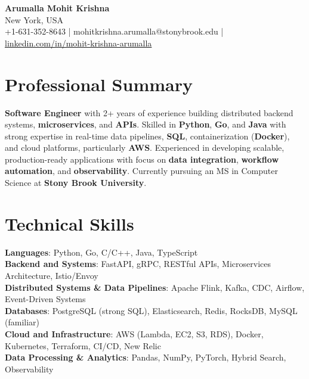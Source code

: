 \documentclass[letterpaper,11pt]{article}
\begin{document}
\begin{center}
  {\Large \textbf{Arumalla Mohit Krishna}} \\
  New York, USA \\
  +1-631-352-8643 \enspace | \enspace mohitkrishna.arumalla@stonybrook.edu \enspace | \enspace \href{https://www.linkedin.com/in/mohit-krishna-arumalla}{linkedin.com/in/mohit-krishna-arumalla}
\end{center}

\section{Professional Summary}
  \begin{itemize}[leftmargin=0.15in, label={}]
    \small{\item{
     \textbf{Software Engineer} with 2+ years of experience building distributed backend systems, \textbf{microservices}, and \textbf{APIs}. Skilled in \textbf{Python}, \textbf{Go}, and \textbf{Java} with strong expertise in real-time data pipelines, \textbf{SQL}, containerization (\textbf{Docker}), and cloud platforms, particularly \textbf{AWS}. Experienced in developing scalable, production-ready applications with focus on \textbf{data integration}, \textbf{workflow automation}, and \textbf{observability}. Currently pursuing an MS in Computer Science at \textbf{Stony Brook University}.
    }}
  \end{itemize}
\vspace{-16pt}

\section{Technical Skills}
 \begin{itemize}[leftmargin=0.15in, label={}]
    \small{\item{
     \textbf{Languages}: Python, Go, C/C++, Java, TypeScript \\
     \textbf{Backend and Systems}: FastAPI, gRPC, RESTful APIs, Microservices Architecture, Istio/Envoy \\
     \textbf{Distributed Systems \& Data Pipelines}: Apache Flink, Kafka, CDC, Airflow, Event-Driven Systems \\
     \textbf{Databases}: PostgreSQL (strong SQL), Elasticsearch, Redis, RocksDB, MySQL (familiar) \\
     \textbf{Cloud and Infrastructure}: AWS (Lambda, EC2, S3, RDS), Docker, Kubernetes, Terraform, CI/CD, New Relic \\
     \textbf{Data Processing \& Analytics}: Pandas, NumPy, PyTorch, Hybrid Search, Observability \\
    }}
 \end{itemize}
\vspace{-16pt}
\end{document}
